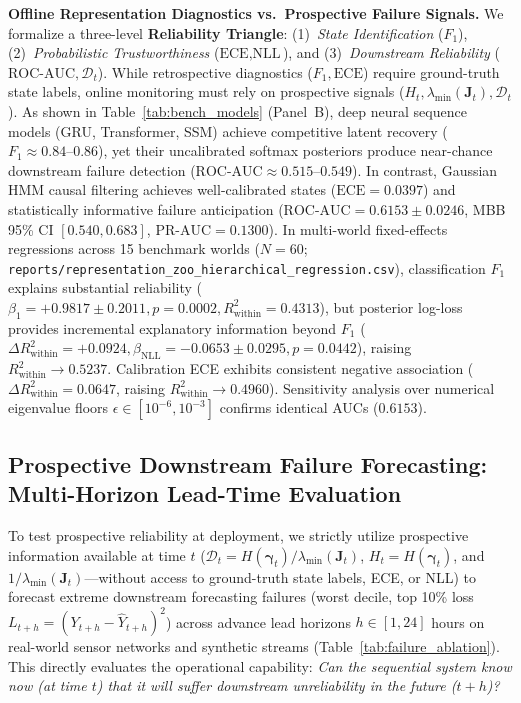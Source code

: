 \documentclass[twoside]{article}
\theoremstyle{definition}
\begin{document}
\textbf{Offline Representation Diagnostics vs.\ Prospective Failure Signals.}
We formalize a three-level \textbf{Reliability Triangle}: (1)~\emph{State Identification} ($F_1$), (2)~\emph{Probabilistic Trustworthiness} ($\text{ECE}, \text{NLL}$), and (3)~\emph{Downstream Reliability} ($\text{ROC-AUC}, \mathcal{D}_t$). While retrospective diagnostics ($F_1, \text{ECE}$) require ground-truth state labels, online monitoring must rely on prospective signals ($H_t, \lambda_{\min}(\boldsymbol{J}_t), \mathcal{D}_t$). As shown in Table~\ref{tab:bench_models} (Panel~B), deep neural sequence models (GRU, Transformer, SSM) achieve competitive latent recovery ($F_1 \approx 0.84\text{--}0.86$), yet their uncalibrated softmax posteriors produce near-chance downstream failure detection ($\text{ROC-AUC} \approx 0.515\text{--}0.549$). In contrast, Gaussian HMM causal filtering achieves well-calibrated states ($\text{ECE} = 0.0397$) and statistically informative failure anticipation ($\text{ROC-AUC} = \mathbf{0.6153 \pm 0.0246}$, MBB 95\% CI $[0.540, 0.683]$, $\text{PR-AUC} = 0.1300$). In multi-world fixed-effects regressions across 15 benchmark worlds ($N=60$; \texttt{reports/representation\_zoo\_hierarchical\_regression.csv}), classification $F_1$ explains substantial reliability ($\beta_1 = +0.9817 \pm 0.2011, p = 0.0002, R^2_{\mathrm{within}} = 0.4313$), but posterior log-loss provides incremental explanatory information beyond $F_1$ ($\Delta R^2_{\mathrm{within}} = +0.0924, \beta_{\mathrm{NLL}} = -0.0653 \pm 0.0295, p = 0.0442$), raising $R^2_{\mathrm{within}} \to 0.5237$. Calibration ECE exhibits consistent negative association ($\Delta R^2_{\mathrm{within}} = 0.0647$, raising $R^2_{\mathrm{within}} \to 0.4960$). Sensitivity analysis over numerical eigenvalue floors $\epsilon \in [10^{-6}, 10^{-3}]$ confirms identical AUCs ($0.6153$).

\subsection{Prospective Downstream Failure Forecasting: Multi-Horizon Lead-Time Evaluation}
\label{app:failure_prediction}
To test prospective reliability at deployment, we strictly utilize prospective information available at time $t$ ($\mathcal{D}_t = H(\boldsymbol{\gamma}_t) / \lambda_{\min}(\boldsymbol{J}_t)$, $H_t = H(\boldsymbol{\gamma}_t)$, and $1/\lambda_{\min}(\boldsymbol{J}_t)$—without access to ground-truth state labels, ECE, or NLL) to forecast extreme downstream forecasting failures (worst decile, top 10\% loss $L_{t+h} = (Y_{t+h} - \hat{Y}_{t+h})^2$) across advance lead horizons $h \in [1, 24]$ hours on real-world sensor networks and synthetic streams (Table~\ref{tab:failure_ablation}). This directly evaluates the operational capability: \emph{Can the sequential system know now (at time $t$) that it will suffer downstream unreliability in the future ($t+h$)?}
\end{document}
